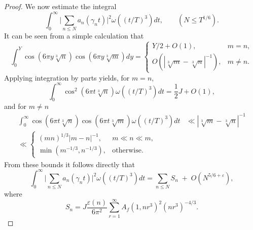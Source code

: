 \documentclass[10pt,leqno]{amsart}
\numberwithin{equation}{section}
\begin{document}
\begin{proof}
We now estimate the integral
\[
\int_0^{\infty} \bigg| \sum_{n \leqslant N} a_n(\gamma_n t) \bigg|^2   \omega \left((t/T)^3\right) dt, \qquad (N \leqslant T^{1/6}).
\]
 It can be seen from a simple calculation that
\[
\int_0^Y \cos(6\pi y \sqrt[3]{n})   \cos(6\pi y \sqrt[3]{m})   dy = 
\begin{cases} 
Y/2 + O(1), & m = n, \\[10pt]
O \left( |\sqrt[3]{m} - \sqrt[3]{n}|^{-1} \right), & m \neq n.
\end{cases}
\]
Applying integration by parts yields, for $m=n$, 
\begin{equation}\label{eq5.2}
    \int_0^{\infty} \cos^2(6\pi t \sqrt[3]{n})   \omega \left((t/T)^3\right) dt = \frac{1}{2} J + O(1),
\end{equation}
and for $m\neq n$
\begin{equation}\label{eq5.3}
    \begin{aligned}
        \int_0^{\infty} \cos(6\pi t \sqrt[3]{n}) \cos(6\pi t \sqrt[3]{m})   \omega \left((t/T)^3\right) dt &\ll |\sqrt[3]{m} - \sqrt[3]{n}|^{-1}\\ \ll 
\begin{cases}
(mn)^{1/3}   |m-n|^{-1}, & m \ll n \ll m, \\
\min \left( m^{-1/3},   n^{-1/3} \right), & \text{otherwise}.
\end{cases}
    \end{aligned}
\end{equation}
From these bounds it follows directly that
\begin{equation}\label{eq5.5}
\int_0^{\infty} \bigg| \sum_{n \leqslant N} a_n(\gamma_n t) \bigg|^2   \omega \left((t/T)^3\right) dt = \sum_{n \leqslant N} S_n \;+\; O \left(N^{5/6+\varepsilon}\right),
\end{equation}
where
\[
S_n = J   \frac{\varepsilon(n)}{6\pi^2} \sum_{r=1}^{\infty} A_f(1, n r^3)^2   (n r^3)^{-4/3}.
\]


\end{proof}
\end{document}
